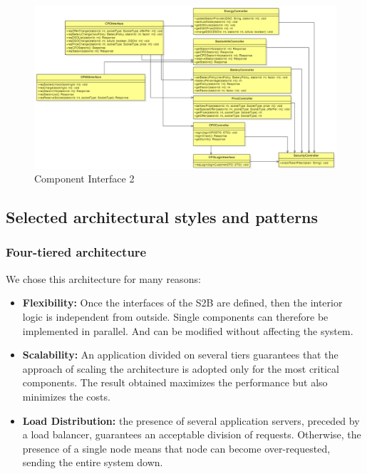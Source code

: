 \begin{figure}[H]
    \begin{center}
        \includegraphics[width=\textwidth]{img/ComponentInterface2.PNG}
        \caption{Component Interface 2}\label{component_interface2}
    \end{center}
\end{figure}

\subsection{Selected architectural styles and patterns}

\subsubsection{Four-tiered architecture}
We chose this architecture for many reasons:
\begin{itemize}
    \item \textbf{Flexibility:} Once the interfaces of the S2B are defined, then the interior logic is independent from outside. Single components can therefore be implemented in parallel. And can be modified without affecting the system.
    \item \textbf{Scalability:} An application divided on several tiers guarantees that the approach of scaling the architecture is adopted only for the most critical components. The result obtained maximizes the performance but also minimizes the costs.
    \item \textbf{Load Distribution:} the presence of several application servers, preceded by a load balancer, guarantees an acceptable division of requests. Otherwise, the presence of a single node means that node can become over-requested, sending the entire system down.
\end{itemize}

